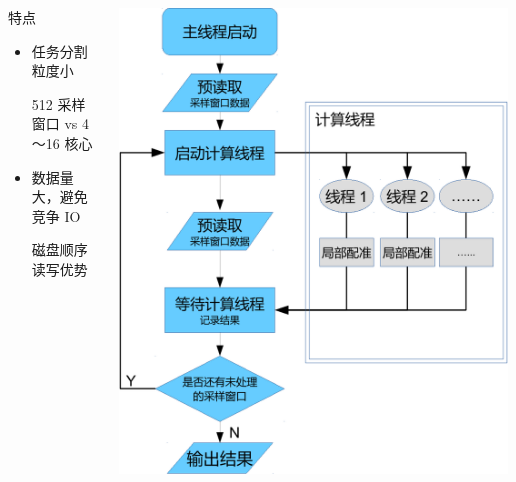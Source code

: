 \documentclass{beamer}
\begin{document}
\begin{frame}
\begin{columns}
\begin{column}{0.5\textwidth}
            \begin{block}{特点}
            \begin{itemize}
                \item 任务分割粒度小 \\ \begin{scriptsize} 512 采样窗口 vs 4～16 核心 \end{scriptsize}
                \item 数据量大，避免竞争 IO \\ \begin{scriptsize} 磁盘顺序读写优势 \end{scriptsize}
            \end{itemize}
            \end{block}
        \end{column}
        \begin{column}{0.5\textwidth}
            \centering
            \includegraphics[width=0.99\textwidth]{figures/parallel-ppt.pdf}
        \end{column}
    \end{columns}
\end{frame}
\end{document}
